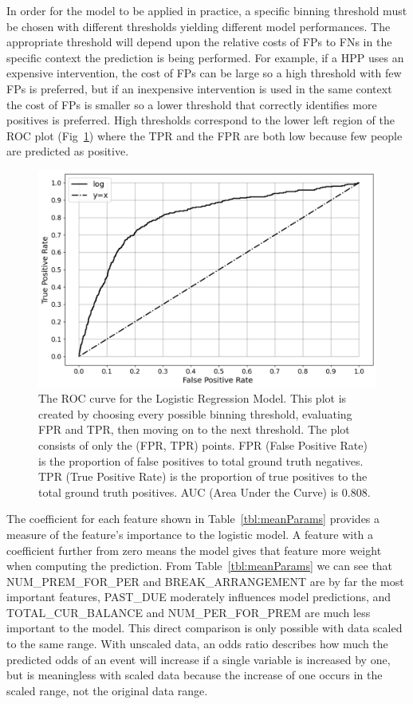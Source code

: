 \documentclass[10pt,letterpaper]{article}
\newcommand{\red}[1]{{\color{red}{#1}}}
\begin{document}
In order for the model to be applied in practice, a specific binning threshold must be chosen with different thresholds yielding different model performances. The appropriate threshold will depend upon the relative costs of FPs to FNs in the specific context the prediction is being performed. For example, if a HPP uses an expensive intervention, the cost of FPs can be large so a high threshold with few FPs is preferred, but if an inexpensive intervention is used in the same context the cost of FPs is smaller so a lower threshold that correctly identifies more positives is preferred. High thresholds correspond to the lower left region of the ROC plot (Fig~\ref{fig:ROC}) where the TPR and the FPR are both low because few people are predicted as positive. \red{remove this paragraph?}

\begin{figure}[htb]
    \centering
    \includegraphics[width=\textwidth]{ROC.png}
    \caption[ROC curve]{The ROC curve for the Logistic Regression Model. This plot is created by choosing every possible binning threshold, evaluating FPR and TPR, then moving on to the next threshold. The plot consists of only the (FPR, TPR) points. FPR (False Positive Rate) is the proportion of false positives to total ground truth negatives. TPR (True Positive Rate) is the proportion of true positives to the total ground truth positives. AUC (Area Under the Curve) is 0.808. \red{REMOVE GRAPHICS BEFORE SUBMISSION}}
    \label{fig:ROC}
\end{figure}

The coefficient for each feature shown in Table~\ref{tbl:meanParams} provides a measure of the feature's importance to the logistic model. A feature with a coefficient further from zero means the model gives that feature more weight when computing the prediction. From Table~\ref{tbl:meanParams} we can see that NUM\_PREM\_FOR\_PER and BREAK\_ARRANGEMENT are by far the most important features, PAST\_DUE moderately influences model predictions, and TOTAL\_CUR\_BALANCE and NUM\_PER\_FOR\_PREM are much less important to the model. This direct comparison is only possible with data scaled to the same range. With unscaled data, an odds ratio describes how much the predicted odds of an event will increase if a single variable is increased by one, but is meaningless with scaled data because the increase of one occurs in the scaled range, not the original data range. 
\end{document}
